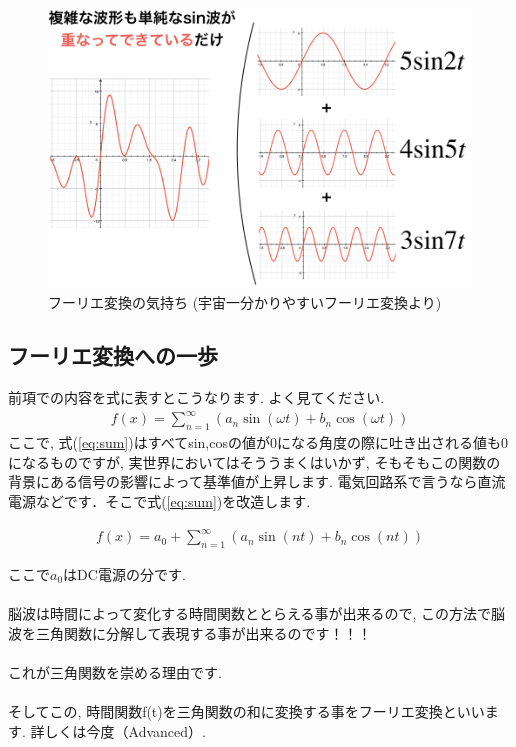 \documentclass[11pt,a4paper]{jreport}
\begin{document}
\begin{figure}[H]
\label{im:furier}
  \centering
  \includegraphics[width=120mm,bb=0 0 974 643]{figures/furier.png}
  \caption{フーリエ変換の気持ち (宇宙一分かりやすいフーリエ変換より)}
\end{figure}

\subsection{フーリエ変換への一歩}
前項での内容を式に表すとこうなります. よく見てください.
\begin{eqnarray}
f(x) = \sum_{n=1}^\infty ({a_n \sin(\omega t) + b_n\cos(\omega t)}
\label{eq:sum})
\end{eqnarray}
ここで, 式(\ref{eq:sum})はすべてsin,cosの値が0になる角度の際に吐き出される値も0になるものですが, 実世界においてはそううまくはいかず, そもそもこの関数の背景にある信号の影響によって基準値が上昇します. 電気回路系で言うなら直流電源などです．そこで式(\ref{eq:sum})を改造します.

\begin{eqnarray}
f(x) = a_0 + \sum_{n=1}^\infty ({a_n \sin(nt) + b_n\cos(nt)}
\label{eq:fixed_sum})
\end{eqnarray}

ここで$a_0$はDC電源の分です.\\
\\
脳波は時間によって変化する時間関数ととらえる事が出来るので, この方法で脳波を三角関数に分解して表現する事が出来るのです！！！\\
\\
これが三角関数を崇める理由です.\\
\\
そしてこの, 時間関数f(t)を三角関数の和に変換する事をフーリエ変換といいます. 詳しくは今度（Advanced）.\\
\end{document}
